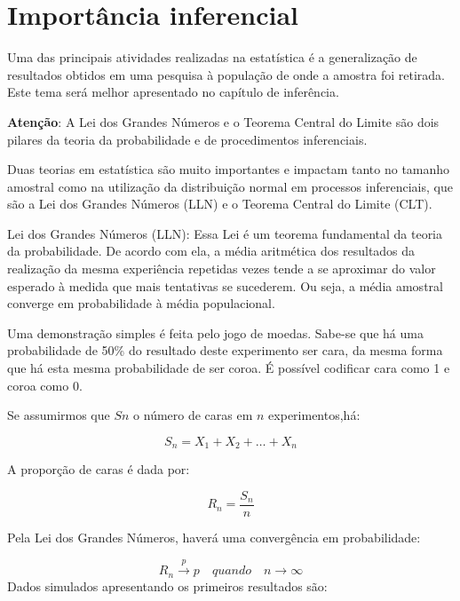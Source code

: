 \documentclass[
]{book}
\newenvironment{Shaded}{\begin{snugshade}}{\end{snugshade}}
\newcommand{\KeywordTok}[1]{\textcolor[rgb]{0.13,0.29,0.53}{\textbf{#1}}}
\newcommand{\NormalTok}[1]{#1}
\newcommand{\OperatorTok}[1]{\textcolor[rgb]{0.81,0.36,0.00}{\textbf{#1}}}
\newcommand{\StringTok}[1]{\textcolor[rgb]{0.31,0.60,0.02}{#1}}
\newenvironment{warning}{
  \definecolor{shadecolor}{rgb}{0, 0, 0}  %
  \color{white}
  \begin{shaded}}
 {\end{shaded}}
\begin{document}
\hypertarget{importuxe2ncia-inferencial}{%
\section{Importância inferencial}\label{importuxe2ncia-inferencial}}

Uma das principais atividades realizadas na estatística é a generalização de resultados obtidos em uma pesquisa à população de onde a amostra foi retirada. Este tema será melhor apresentado no capítulo de inferência.

\begin{warning}

\textbf{Atenção}: A Lei dos Grandes Números e o Teorema Central do Limite são dois pilares da teoria da probabilidade e de procedimentos inferenciais.

\end{warning}

Duas teorias em estatística são muito importantes e impactam tanto no tamanho amostral como na utilização da distribuição normal em processos inferenciais, que são a Lei dos Grandes Números (LLN) e o Teorema Central do Limite (CLT).

Lei dos Grandes Números (LLN): Essa Lei é um teorema fundamental da teoria da probabilidade. De acordo com ela, a média aritmética dos resultados da realização da mesma experiência repetidas vezes tende a se aproximar do valor esperado à medida que mais tentativas se sucederem. Ou seja, a média amostral converge em probabilidade à média populacional.

Uma demonstração simples é feita pelo jogo de moedas. Sabe-se que há uma probabilidade de 50\% do resultado deste experimento ser cara, da mesma forma que há esta mesma probabilidade de ser coroa. É possível codificar cara como 1 e coroa como 0.

Se assumirmos que \(Sn\) o número de caras em \(n\) experimentos,há:

\[S_n = X_1 + X_2 + \dots + X_n\]

A proporção de caras é dada por:

\[R_n = \frac{S_n}{n}\]

Pela Lei dos Grandes Números, haverá uma convergência em probabilidade:

\[R_n \overset{p}{\to} p\quad quando \quad n \rightarrow \infty \]
Dados simulados apresentando os primeiros resultados são:

\begin{Shaded}
\end{Shaded}
\end{document}
